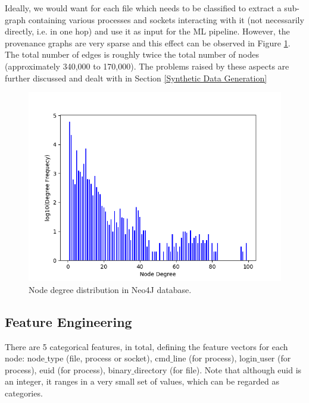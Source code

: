Ideally, we would want for each file which needs to be classified to extract a sub-graph containing various processes and sockets interacting with it (not necessarily directly, i.e. in one hop) and use it as input for the ML pipeline. However, the provenance graphs are very sparse and this effect can be observed in Figure \ref{nodedegdist}. The total number of edges is roughly twice the total number of nodes (approximately 340,000 to 170,000). The problems raised by these aspects are further discussed and dealt with in Section \ref{Synthetic Data Generation} \\


\begin{figure}[H]
  \centering
  \centerline{\includegraphics[scale = 0.86]{Images/nodedegdist.png}}
  \caption{Node degree distribution in Neo4J database.}
  \label{nodedegdist}
\end{figure}


\subsection{Feature Engineering}

There are 5 categorical features, in total, defining the feature vectors for each node: node$\_$type (file, process or socket), cmd$\_$line (for process), login$\_$user (for process), euid (for process), binary$\_$directory (for file). Note that although euid is an integer, it ranges in a very small set of values, which can be regarded as categories. \\


